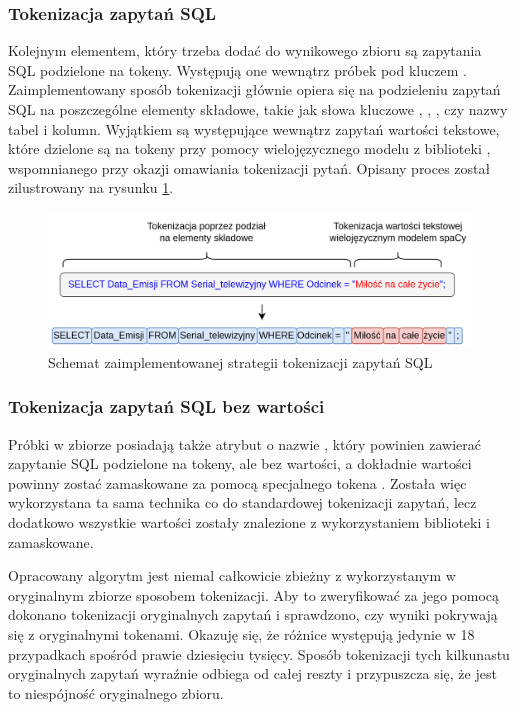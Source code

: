 \subsubsection{Tokenizacja zapytań SQL}
Kolejnym elementem, który trzeba dodać do wynikowego zbioru są zapytania SQL podzielone na tokeny. Występują one wewnątrz próbek pod kluczem . Zaimplementowany sposób tokenizacji głównie opiera się na podzieleniu zapytań SQL na poszczególne elementy składowe, takie jak słowa kluczowe , , , czy nazwy tabel i kolumn. Wyjątkiem są występujące wewnątrz zapytań wartości tekstowe, które dzielone są na tokeny przy pomocy wielojęzycznego modelu z biblioteki , wspomnianego przy okazji omawiania tokenizacji pytań. Opisany proces został zilustrowany na rysunku \ref{fig:query-tokenization}.

\begin{figure}[ht!]
  \centering
  \includegraphics[width=1.0\linewidth]{images/query_tokenization.png}
  \caption{Schemat zaimplementowanej strategii tokenizacji zapytań SQL}
  \label{fig:query-tokenization}
\end{figure}

\subsubsection{Tokenizacja zapytań SQL bez wartości}
Próbki w zbiorze  posiadają także atrybut o nazwie , który powinien zawierać zapytanie SQL podzielone na tokeny, ale bez wartości, a dokładnie wartości powinny zostać zamaskowane za pomocą specjalnego tokena . Została więc wykorzystana ta sama technika co do standardowej tokenizacji zapytań, lecz dodatkowo wszystkie wartości zostały znalezione z wykorzystaniem biblioteki  i zamaskowane.

Opracowany algorytm jest niemal całkowicie zbieżny z wykorzystanym w oryginalnym zbiorze  sposobem tokenizacji. Aby to zweryfikować za jego pomocą dokonano tokenizacji oryginalnych zapytań i sprawdzono, czy wyniki pokrywają się z oryginalnymi tokenami. Okazuję się, że różnice występują jedynie w 18 przypadkach spośród prawie dziesięciu tysięcy. Sposób tokenizacji tych kilkunastu oryginalnych zapytań wyraźnie odbiega od całej reszty i przypuszcza się, że jest to niespójność oryginalnego zbioru. 

